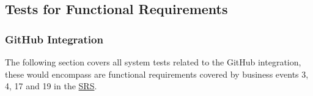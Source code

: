 \documentclass[12pt, titlepage]{article}
\begin{document}
	\subsection{Tests for Functional Requirements}
	
	
	
	
	\subsubsection{GitHub Integration}
	
	The following section covers all system tests related to the GitHub integration, these would encompass are functional requirements covered by business events 3, 4, 17 and 19 in the \href{https://github.com/RutheniumVI/UnderTree/blob/main/docs/SRS/SRS.pdf}{SRS}.
	
	
\end{document}
